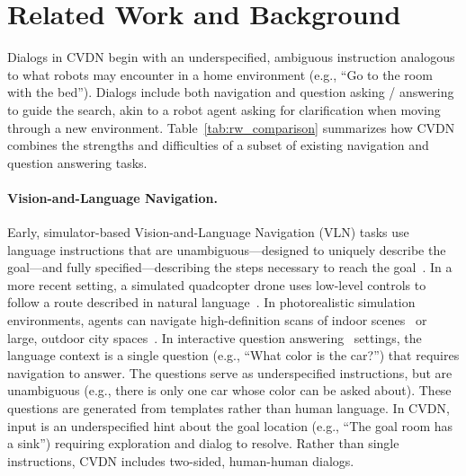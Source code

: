 \documentclass{article}
\newcommand{\dataset}{CVDN}
\begin{document}
\section{Related Work and Background}
\label{sec:related_work}

Dialogs in \dataset{} begin with an underspecified, ambiguous instruction analogous to what robots may encounter in a home environment (e.g., ``Go to the room with the bed'').
Dialogs include both navigation and question asking / answering to guide the search, akin to a robot agent asking for clarification when moving through a new environment.
Table~\ref{tab:rw_comparison} summarizes how \dataset{} combines the strengths and difficulties of a subset of existing navigation and question answering tasks.

\paragraph{Vision-and-Language Navigation.}
Early, simulator-based Vision-and-Language Navigation (VLN) tasks use language instructions that are unambiguous---designed to uniquely describe the goal---and fully specified---describing the steps necessary to reach the goal~\cite{macmahon:aaai06,chen:aaai11}.
In a more recent setting, a simulated quadcopter drone uses low-level controls to follow a route described in natural language~\cite{blukis:corl18}.
In photorealistic simulation environments, agents can navigate high-definition scans of indoor scenes~\cite{anderson:cvpr18} or large, outdoor city spaces~\cite{chen:cvpr19}.
In interactive question answering~\cite{das:cvpr18,gordon2018iqa} settings, the language context is a single question (e.g., ``What color is the car?'') that requires navigation to answer.
The questions serve as underspecified instructions, but are unambiguous (e.g., there is only one car whose color can be asked about).
These questions are generated from templates rather than human language.
In \dataset{}, input is an underspecified hint about the goal location (e.g., ``The goal room has a sink'') requiring exploration and dialog to resolve.
Rather than single instructions, \dataset{} includes two-sided, human-human dialogs.
\end{document}
